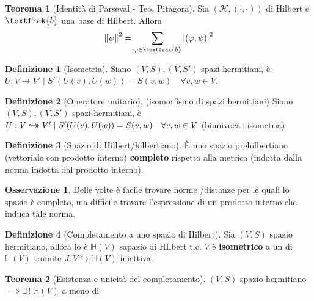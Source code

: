 \documentclass[a4paper,10pt]{article}
\theoremstyle{definition}
\newcommand{\inj}{\hookrightarrow} %
\newcommand{\hookdoubleheadrightarrow}{\hookrightarrow\mathrel{\mspace{-15mu}}\rightarrow}
\newcommand{\bij}{\hookdoubleheadrightarrow} %
\newcommand{\hil}{\mathcal{H}} %
\theoremstyle{indentdefinition}
\newtheorem{defn}{Definizione}[section]
\theoremstyle{indenttheorem}
\newtheorem{thm}{Teorema}
\theoremstyle{myremark}
\newtheorem*{rem*}{Osservazione}
\theoremstyle{indentgeneral}
\begin{document}
\begin{thm}[Identità di Parseval - Teo. Pitagora] \label{thm-identità-parseval}
    Sia $(\hil,(\cdot,\cdot))$ di Hilbert e $\textfrak{b}$ una base di Hilbert. Allora
    $$\norm{\psi}^2=\sum_{\varphi\in\textfrak{b}}\abs{(\varphi,\psi)}^2$$
\end{thm}

\begin{defn}[Isometria]
    Siano $(V,S),(V,S')$ spazi hermitiani, è $U:V\to V'\mid S'(U(v),U(w))=S(v,w)\quad\forall v,w\in V$.
\end{defn}

\begin{defn}[Operatore unitario] (isomorfismo di spazi hermitiani) \label{defn-operatore-unitario}
    Siano $(V,S),(V,S')$ spazi hermitiani, è $U:V\bij V'\mid S'(U(v),U(w))=S(v,w)\quad\forall v,w\in V$ (biunivoca+isometria)
\end{defn}

\begin{defn}[Spazio di Hilbert/hilbertiano]
    È uno spazio prehilbertiano (vettoriale con prodotto interno) \textbf{completo} rispetto alla metrica (indotta dalla norma indotta dal prodotto interno).
\end{defn}

\begin{rem*}
     Delle volte è facile trovare norme /distanze per le quali lo spazio è completo, ma difficile trovare l'espressione di un prodotto interno che induca tale norma.
\end{rem*}

\begin{defn}[Completamento a uno spazio di Hilbert] \label{defn-completamento-Hilbert}
    Sia $(V, S)$ spazio hermitiano, allora lo è $\mathbb{H}(V)$ sapazio di HIlbert t.c. $V$ è \textbf{isometrico} a un  di $\mathbb{H}(V)$ tramite $J:V\inj \mathbb{H}(V)$ iniettiva.
\end{defn}

\begin{thm}[Esistenza e unicità del completamento]
    $(V,S)$ spazio hermitiano $\implies\exists\,!\;\mathbb{H}(V)$  a meno di 
\end{thm}
\end{document}
